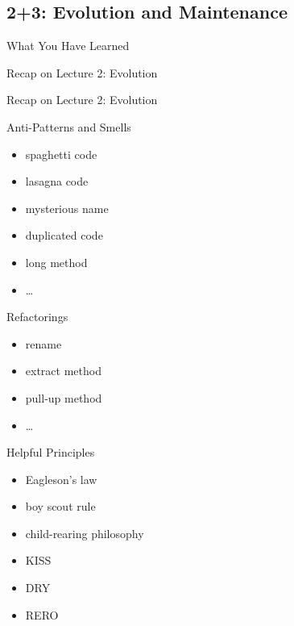 \subsection{2+3: Evolution and Maintenance}
\begin{frame}{What You Have Learned}
	\frameCourseQuestions
\end{frame}

\begin{frame}{Recap on Lecture 2: Evolution}
	\frameLehmansLaws
\end{frame}

\begin{frame}{Recap on Lecture 2: Evolution}
	\begin{fancycolumns}
		\begin{note}{Anti-Patterns and Smells}
			\begin{itemize}
				\item spaghetti code
				\item lasagna code
				\item mysterious name
				\item duplicated code
				\item long method
				\item \ldots{}
			\end{itemize}
		\end{note}
		\begin{note}{Refactorings}
			\begin{itemize}
				\item rename
				\item extract method
				\item pull-up method
				\item \ldots{}
			\end{itemize}
		\end{note}
	\nextcolumn
		\begin{note}{Helpful Principles}
			\begin{itemize}
				\item Eagleson's law
				\item boy scout rule
				\item child-rearing philosophy
				\item KISS
				\item DRY
				\item RERO
			\end{itemize}
		\end{note}
	\end{fancycolumns}
\end{frame}

